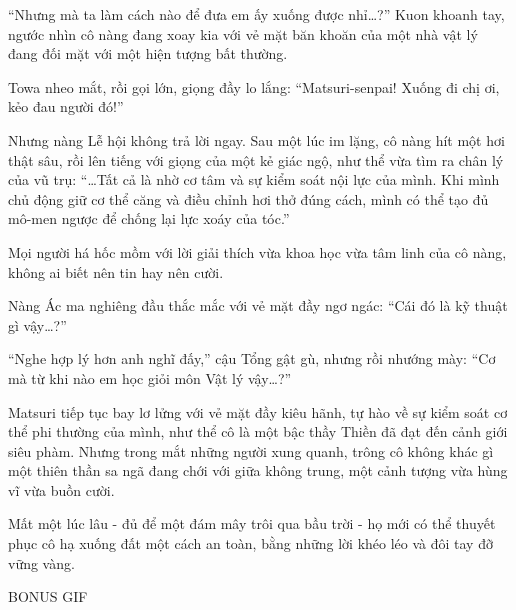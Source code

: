 \documentclass[../main.tex]{subfiles}
\begin{document}
``Nhưng mà ta làm cách nào để đưa em ấy xuống được nhỉ\dots?'' Kuon khoanh tay, ngước nhìn cô nàng đang xoay kia với vẻ mặt băn khoăn của một nhà vật lý đang đối mặt với một hiện tượng bất thường.

Towa nheo mắt, rồi gọi lớn, giọng đầy lo lắng: ``Matsuri-senpai! Xuống đi chị ơi, kẻo đau người đó!''

Nhưng nàng Lễ hội không trả lời ngay. Sau một lúc im lặng, cô nàng hít một hơi thật sâu, rồi lên tiếng với giọng của một kẻ giác ngộ, như thể vừa tìm ra chân lý của vũ trụ: ``\dots Tất cả là nhờ cơ tâm và sự kiểm soát nội lực của mình. Khi mình chủ động giữ cơ thể căng và điều chỉnh hơi thở đúng cách, mình có thể tạo đủ mô-men ngược để chống lại lực xoáy của tóc.''

Mọi người há hốc mồm với lời giải thích vừa khoa học vừa tâm linh của cô nàng, không ai biết nên tin hay nên cười.

Nàng Ác ma nghiêng đầu thắc mắc với vẻ mặt đầy ngơ ngác: ``Cái đó là kỹ thuật gì vậy\dots?''

``Nghe hợp lý hơn anh nghĩ đấy,'' cậu Tổng gật gù, nhưng rồi nhướng mày: ``Cơ mà từ khi nào em học giỏi môn Vật lý vậy\dots?''

Matsuri tiếp tục bay lơ lửng với vẻ mặt đầy kiêu hãnh, tự hào về sự kiểm soát cơ thể phi thường của mình, như thể cô là một bậc thầy Thiền đã đạt đến cảnh giới siêu phàm. Nhưng trong mắt những người xung quanh, trông cô không khác gì một thiên thần sa ngã đang chới với giữa không trung, một cảnh tượng vừa hùng vĩ vừa buồn cười.

Mất một lúc lâu - đủ để một đám mây trôi qua bầu trời - họ mới có thể thuyết phục cô hạ xuống đất một cách an toàn, bằng những lời khéo léo và đôi tay đỡ vững vàng.

\begin{center}
  {\ab BONUS GIF}
\end{center}
\end{document}

